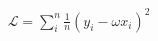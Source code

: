 \documentclass[preview]{standalone}
\begin{document}
\begin{align*}
\mathcal{L} =  \sum_i^n \frac{1}{n} (y_i- \omega x_i)^2
\end{align*}
\end{document}
